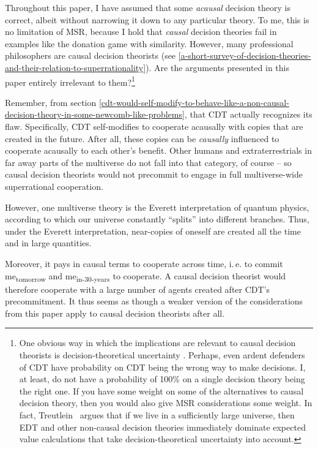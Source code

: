 Throughout this paper, I have assumed that some \emph{acausal} decision
theory is correct, albeit without narrowing it down to any particular
theory. To me, this is no limitation of MSR, because I hold that
\emph{causal} decision theories fail in examples like the donation game
with similarity. However, many professional philosophers are causal
decision theorists (see
\ref{a-short-survey-of-decision-theories-and-their-relation-to-superrationality}). Are the arguments presented in this paper
entirely irrelevant to them?\footnote{One obvious way in which the
  implications are relevant to causal decision theorists is
  decision-theoretical uncertainty
  \parencite{MacAskill2016-zo}. Perhaps, even ardent
  defenders of CDT have probability on CDT being the wrong way to make
  decisions. I, at least, do not have a probability of 100\% on a single
  decision theory being the right one. If you have some weight on some
  of the alternatives to causal decision theory, then you would also
  give MSR considerations some weight. In fact, Treutlein~\citeyear{Treutlein2017} 
  argues that if we live in a sufficiently large universe,
  then EDT and other non-causal decision theories immediately dominate
  expected value calculations that take decision-theoretical uncertainty
  into account.}

Remember, from section
\ref{cdt-would-self-modify-to-behave-like-a-non-causal-decision-theory-in-some-newcomb-like-problems}, that CDT actually recognizes its flaw. Specifically,
CDT self-modifies to cooperate acausally with copies that are created in
the future. After all, these copies can be \emph{causally} influenced to
cooperate acausally to each other's benefit. Other humans and
extraterrestrials in far away parts of the multiverse do not fall into
that category, of course -- so causal decision theorists would not
precommit to engage in full multiverse-wide superrational cooperation.

However, one multiverse theory is the Everett interpretation of quantum
physics, according to which our universe constantly ``splits'' into
different branches. Thus, under the Everett interpretation, near-copies
of oneself are created all the time and in large quantities.

Moreover, it pays in causal terms to cooperate across time, i.\,e. to
commit me\textsubscript{tomorrow} and me\textsubscript{in-30-years} to
cooperate. A causal decision theorist would therefore cooperate with a
large number of agents created after CDT's precommitment. It thus seems
as though a weaker version of the considerations from this paper apply
to causal decision theorists after all.


